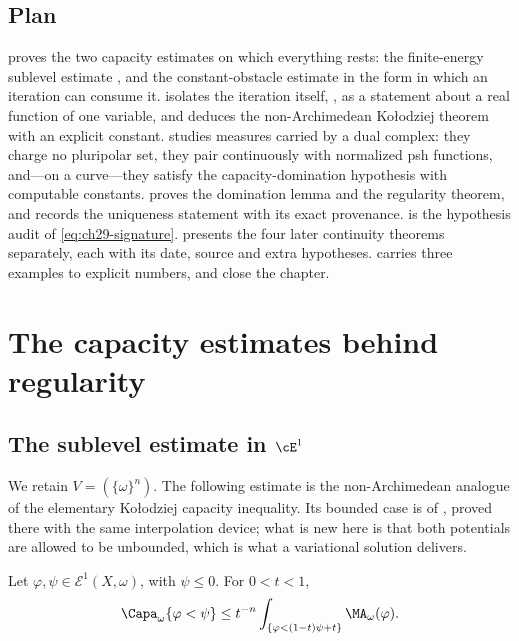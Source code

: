 \subsection{Plan}
\label{sec:ch29-plan}

 proves the two capacity estimates on which
everything rests: the finite-energy sublevel estimate
, and the constant-obstacle estimate
 in the form in which an iteration can
consume it.   isolates the iteration itself,
, as a statement about a real function of one
variable, and deduces the non-Archimedean Ko\l odziej theorem
 with an explicit constant.
 studies measures carried by a dual complex: they
charge no pluripolar set, they pair continuously with normalized psh
functions, and---on a curve---they satisfy the capacity-domination
hypothesis with computable constants.   proves the
domination lemma and the regularity theorem, and records the uniqueness
statement with its exact provenance.   is the
hypothesis audit of \eqref{eq:ch29-signature}.  
presents the four later continuity theorems separately, each with its date,
source and extra hypotheses.   carries three examples
to explicit numbers, and  close the
chapter.

\section{The capacity estimates behind regularity}
\label{sec:ch29-capacity}

\subsection{The sublevel estimate in \texorpdfstring{$\cE^1$}{E1}}
\label{sec:ch29-sublevel}

We retain \(V=(\{\omega\}^n)\).  The following estimate is the
non-Archimedean analogue of the elementary Ko\l odziej capacity inequality.
Its bounded case is  of
, proved there with the same interpolation device;
what is new here is that both potentials are allowed to be unbounded, which
is what a variational solution delivers.

\begin{lemma}\label{lem:bfj-kolodziej-sublevel}
Let \(\varphi,\psi\in\mathcal E^1(X,\omega)\), with \(\psi\leq0\).  For
\(0<t<1\),
\begin{equation}
\label{eq:bfj-kolodziej-sublevel}
 \Capa_\omega\{\varphi<\psi\}
 \leq t^{-n}
 \int_{\{\varphi<(1-t)\psi+t\}}
             \MA_\omega(\varphi).
\end{equation}
\end{lemma}

